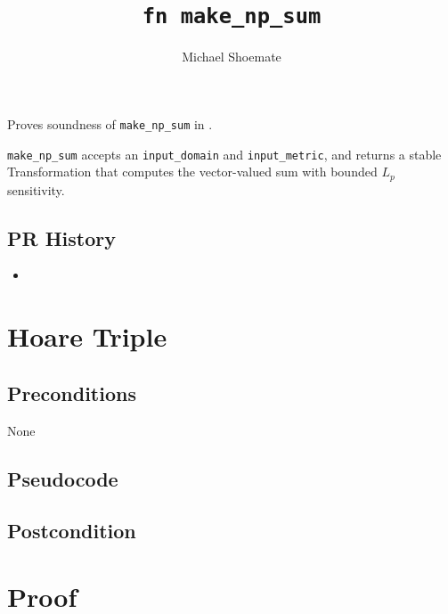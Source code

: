 \documentclass{article}
\title{\texttt{fn make\_np\_sum}}
\author{Michael Shoemate}
\begin{document}
\maketitle

\contrib

Proves soundness of \texttt{make\_np\_sum} in .

\texttt{make\_np\_sum} accepts an \texttt{input\_domain} and \texttt{input\_metric},
and returns a stable Transformation that computes the vector-valued sum with bounded $L_p$ sensitivity.

\subsection*{PR History}
\begin{itemize}
    \item {}
\end{itemize}

\section{Hoare Triple}

\subsection*{Preconditions}
None

\subsection*{Pseudocode}


\subsection*{Postcondition}


\section{Proof}
\end{document}
